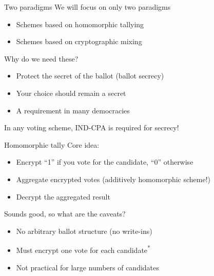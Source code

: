 \begin{frame}{Two paradigms}
  We will focus on only two paradigms
  \begin{itemize}[<+(1)->]
    \item Schemes based on homomorphic tallying
    \item Schemes based on cryptographic mixing
  \end{itemize}

  \vspace*{1em}

  \pause
  Why do we need these?
  \begin{itemize}[<+(1)->]
    \item Protect the secret of the ballot (ballot secrecy)
    \item Your choice should remain a secret
    \item A requirement in many democracies
  \end{itemize}

  \vspace*{1em}

  \pause
  In any voting scheme, IND-CPA is required for secrecy!
\end{frame}

\begin{frame}{Homomorphic tally}
  Core idea:
  \begin{itemize}[<+(1)->]
    \item Encrypt \enquote{1} if you vote for the candidate, \enquote{0} otherwise
    \item Aggregate encrypted votes (additively homomorphic scheme!)
    \item Decrypt the aggregated result
  \end{itemize}

  \vspace*{1em}

  \pause
  Sounds good, so what are the caveats?
  \begin{itemize}[<+(1)->]
    \item No arbitrary ballot structure (no write-ins)
    \item Must encrypt one vote for each candidate\textsuperscript{*}
    \item Not practical for large numbers of candidates
  \end{itemize}
\end{frame}

